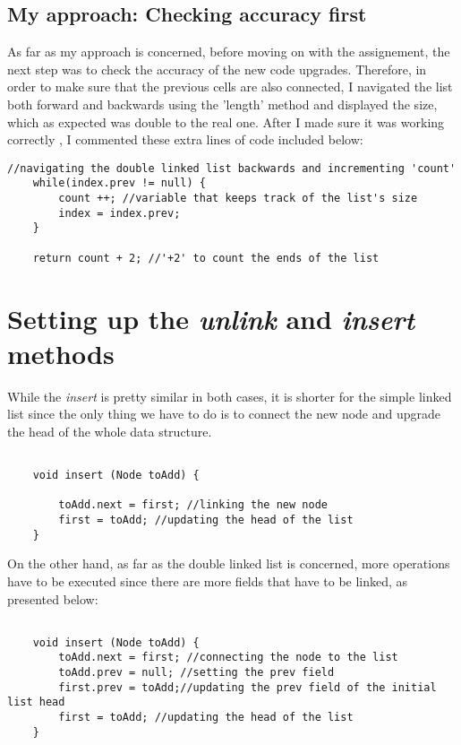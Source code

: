 \documentclass[a4paper,11pt]{article}
\begin{document}
\subsection*{My approach: Checking accuracy first}

As far as my approach is concerned, before moving on with the assignement, the next step was to check the accuracy of the new code upgrades.
Therefore, in order to make sure that the previous cells are also connected, I navigated the list both forward and backwards 
using the 'length' method and displayed the size, which as expected was double to the real one. After I made sure it was working correctly , I commented
these extra lines of code included below: \newline\newline

\begin{verbatim}
//navigating the double linked list backwards and incrementing 'count'
    while(index.prev != null) {
        count ++; //variable that keeps track of the list's size
        index = index.prev;
    }

    return count + 2; //'+2' to count the ends of the list

\end{verbatim}

\section*{Setting up the \textit{unlink} and \textit{insert} methods}

While the \textit{insert} is pretty similar in both cases, it is shorter for the simple linked list since the only thing we have to do is 
to connect the new node and upgrade the head of the whole data structure. 

\begin{verbatim}

    void insert (Node toAdd) {

        toAdd.next = first; //linking the new node
        first = toAdd; //updating the head of the list
    }

\end{verbatim}

On the other hand, as far as the double linked list is concerned, more operations have to be executed since there are more fields that have to be linked,
as presented below:

\begin{verbatim}
   
    void insert (Node toAdd) {
        toAdd.next = first; //connecting the node to the list
        toAdd.prev = null; //setting the prev field
        first.prev = toAdd;//updating the prev field of the initial list head
        first = toAdd; //updating the head of the list
    }
\end{verbatim}
\end{document}
